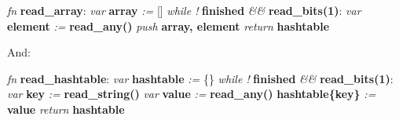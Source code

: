 \begin{changemargin}{-60mm}{0mm}
\begin{myquote}

\vbox{
\textit{fn} \textbf{read\_array}: \newline
\indent\hspace{.5cm} \textit{var} \textbf{array} \textit{:=} [] \newline
\indent\hspace{.5cm} \textit{while !} \textbf{finished} \textit{\&\&} \textbf{read\_bits(1)}: \newline
\indent\hspace{1cm} \textit{var} \textbf{element} \textit{:=} \textbf{read\_any()} \newline
\indent\hspace{1cm} \textit{push} \textbf{array, element} \newline
\indent\hspace{.5cm} \textit{return} \textbf{hashtable} \newline
}

\end{myquote}
\end{changemargin}

And:

\begin{changemargin}{-60mm}{0mm}
\begin{myquote}

\vbox{
\textit{fn} \textbf{read\_hashtable}: \newline
\indent\hspace{.5cm} \textit{var} \textbf{hashtable} \textit{:=} \{\} \newline
\indent\hspace{.5cm} \textit{while !} \textbf{finished} \textit{\&\&} \textbf{read\_bits(1)}: \newline
\indent\hspace{1cm} \textit{var} \textbf{key} \textit{:=} \textbf{read\_string()} \newline
\indent\hspace{1cm} \textit{var} \textbf{value} \textit{:=} \textbf{read\_any()} \newline
\indent\hspace{1cm} \textbf{hashtable\{key\}} \textit{:=} \textbf{value} \newline
\indent\hspace{.5cm} \textit{return} \textbf{hashtable} \newline
}

\end{myquote}
\end{changemargin}

